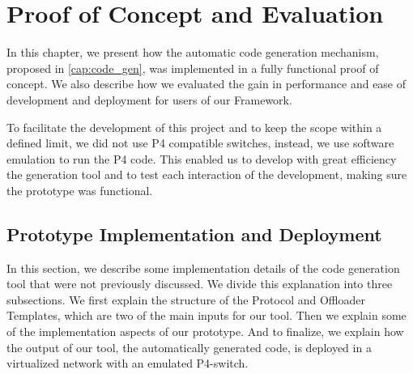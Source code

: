 \chapter{Proof of Concept and Evaluation}
\label{cap:evaluation}


In this chapter, we present how the automatic code generation mechanism, proposed in \autoref{cap:code_gen}, was implemented in a fully functional proof of concept. We also describe how we evaluated the gain in performance and ease of development and deployment for users of our Framework.

To facilitate the development of this project and to keep the scope within a defined limit, we did not use P4 compatible switches, instead, we use software emulation to run the P4 code. This enabled us to develop with great efficiency the generation tool and to test each interaction of the development, making sure the prototype was functional.



\section{Prototype Implementation and Deployment}
\label{sec:evaluation:implementation}






In this section, we describe some implementation details of the code generation tool that were not previously discussed. We divide this explanation into three subsections. We first explain the structure of the Protocol and Offloader Templates, which are two of the main inputs for our tool. Then we explain some of the implementation aspects of our prototype. And to finalize, we explain how the output of our tool, the automatically generated code, is deployed in a virtualized network with an emulated P4-switch.


